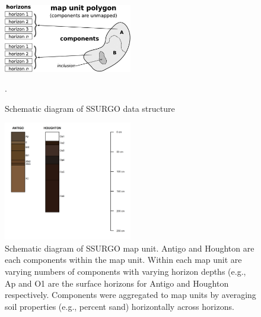	\begin{figure}[h]
	  \centering
	    \includegraphics[width=0.5\textwidth]{./img/ssurgo_data_structure_schematic.jpeg}
		\caption[Schematic diagram of SSURGO data structure]{Schematic diagram of SSURGO data structure \cite{gatzke_aggregation_2011}}.
		\label{fig:ssurgo_schematic}
	\end{figure}

\begin{figure}[h]
  \centering
    \includegraphics[width=0.5\textwidth]{./img/component_schematic.png}
	\caption[Schematic diagram of SSURGO map unit]{Schematic diagram of SSURGO map unit. Antigo and Houghton are each components within the map unit. Within each map unit are varying numbers of components with varying horizon depths (e.g., Ap and O1 are the surface horizons for Antigo and Houghton respectively. Components were aggregated to map units by averaging soil properties (e.g., percent sand) horizontally across horizons.}
	\label{fig:component_schematic}
\end{figure}



 

